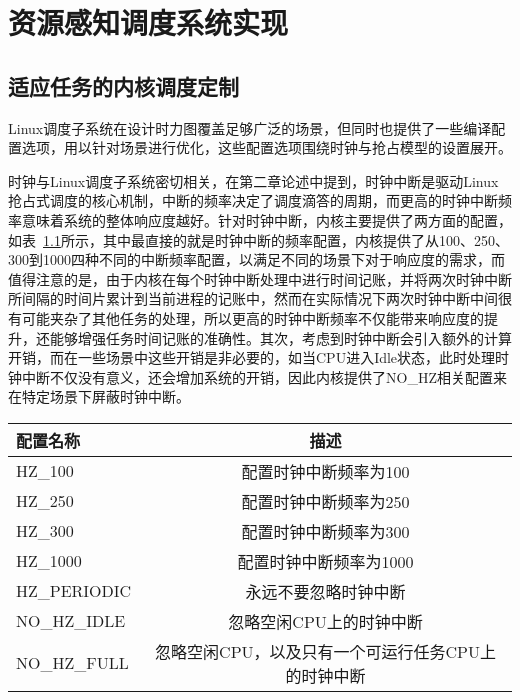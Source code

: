 \chapter{资源感知调度系统实现}\label{chap:sched_policy}

\section{适应任务的内核调度定制}

Linux调度子系统在设计时力图覆盖足够广泛的场景，但同时也提供了一些编译配置选项，用以针对场景进行优化，这些配置选项围绕时钟与抢占模型的设置展开。

时钟与Linux调度子系统密切相关，在第二章论述中提到，时钟中断是驱动Linux抢占式调度的核心机制，中断的频率决定了调度滴答的周期，而更高的时钟中断频率意味着系统的整体响应度越好。针对时钟中断，内核主要提供了两方面的配置，如表~\ref{tab:config_hz}所示，其中最直接的就是时钟中断的频率配置，内核提供了从100、250、300到1000四种不同的中断频率配置，以满足不同的场景下对于响应度的需求，而值得注意的是，由于内核在每个时钟中断处理中进行时间记账，并将两次时钟中断所间隔的时间片累计到当前进程的记账中，然而在实际情况下两次时钟中断中间很有可能夹杂了其他任务的处理，所以更高的时钟中断频率不仅能带来响应度的提升，还能够增强任务时间记账的准确性。其次，考虑到时钟中断会引入额外的计算开销，而在一些场景中这些开销是非必要的，如当CPU进入Idle状态，此时处理时钟中断不仅没有意义，还会增加系统的开销，因此内核提供了NO\_HZ相关配置来在特定场景下屏蔽时钟中断。

\begin{table}
    \label{tab:config_hz}
    \footnotesize%
    \setlength{\tabcolsep}{4pt}%
    \renewcommand{\arraystretch}{1.5}%
    \centering
    \begin{tabular}{lc}
        \hline
        配置名称 & 描述 \\
        \hline
        HZ\_100  & 配置时钟中断频率为100  \\
        HZ\_250  & 配置时钟中断频率为250 \\
        HZ\_300  & 配置时钟中断频率为300 \\
        HZ\_1000 & 配置时钟中断频率为1000 \\
        HZ\_PERIODIC & 永远不要忽略时钟中断 \\
        NO\_HZ\_IDLE & 忽略空闲CPU上的时钟中断 \\
        NO\_HZ\_FULL & 忽略空闲CPU，以及只有一个可运行任务CPU上的时钟中断 \\
        \hline
    \end{tabular}
\end{table}

